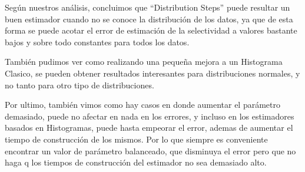 	Seg\'un nuestros an\'alisis, concluimos que ``Distribution Steps'' puede resultar un buen estimador cuando no se conoce la distribuci\'on de los datos, ya que de esta forma se puede acotar el error de estimaci\'on de la selectividad a valores bastante bajos y sobre todo constantes para todos los datos.
		
	Tambi\'en pudimos ver como realizando una peque\~na mejora a un Histograma Clasico, se pueden obtener resultados interesantes para distribuciones normales, y no tanto para otro tipo de distribuciones.
	
	Por ultimo, tambi\'en vimos como hay casos en donde aumentar el par\'ametro demasiado, puede no afectar en nada en los errores, y incluso en los estimadores basados en Histogramas, puede hasta empeorar el error, ademas de aumentar el tiempo de construcci\'on de los mismos. Por lo que siempre es conveniente encontrar un valor de par\'ametro balanceado, que disminuya el error pero que no haga q los tiempos de construcci\'on del estimador no sea demasiado alto.